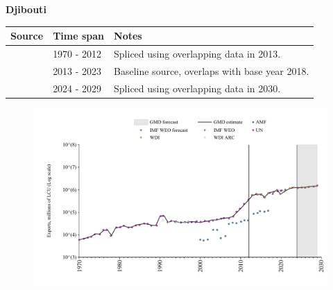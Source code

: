 \documentclass[12pt,a4paper,landscape]{article}
\begin{document}
\begin{adjustbox}{max totalsize={\paperwidth}{\paperheight},center}
\begin{minipage}[t][\textheight][t]{\textwidth}
\vspace*{0.5cm}
{}
\begin{center}
{\Large\bfseries Djibouti}
\end{center}
\vspace{0.5cm}
\begin{table}[H]
\centering
\small
\begin{tabular}{|l|l|l|}
\hline
\textbf{Source} & \textbf{Time span} & \textbf{Notes} \\
\hline
\rowcolor{white}\cite{UN}& 1970 - 2012 &Spliced using overlapping data in 2013.\\
\rowcolor{lightgray}\cite{WDI}& 2013 - 2023 &Baseline source, overlaps with base year 2018.\\
\rowcolor{white}\cite{IMF_WEO_forecast}& 2024 - 2029 &Spliced using overlapping data in 2030.\\
\hline
\end{tabular}
\end{table}
\begin{figure}[H]
\centering
\includegraphics[width=\textwidth,height=0.6\textheight,keepaspectratio]{graphs/DJI_exports.pdf}
\end{figure}
\end{minipage}
\end{adjustbox}
\end{document}
